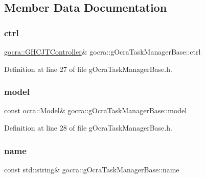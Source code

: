\subsection{Member Data Documentation}
\hypertarget{classgocra_1_1gOcraTaskManagerBase_a52d76d9b54d92f3d31faeaafda99e4c7}{}\label{classgocra_1_1gOcraTaskManagerBase_a52d76d9b54d92f3d31faeaafda99e4c7} 
\subsubsection{\texorpdfstring{ctrl}{ctrl}}
{\footnotesize\ttfamily \hyperlink{classgocra_1_1GHCJTController}{gocra\+::\+G\+H\+C\+J\+T\+Controller}\& gocra\+::g\+Ocra\+Task\+Manager\+Base\+::ctrl\hspace{0.3cm}{\ttfamily [protected]}}



Definition at line 27 of file g\+Ocra\+Task\+Manager\+Base.\+h.

\hypertarget{classgocra_1_1gOcraTaskManagerBase_adc439e7170f7120611fc6d009d06404e}{}\label{classgocra_1_1gOcraTaskManagerBase_adc439e7170f7120611fc6d009d06404e} 
\subsubsection{\texorpdfstring{model}{model}}
{\footnotesize\ttfamily const ocra\+::\+Model\& gocra\+::g\+Ocra\+Task\+Manager\+Base\+::model\hspace{0.3cm}{\ttfamily [protected]}}



Definition at line 28 of file g\+Ocra\+Task\+Manager\+Base.\+h.

\hypertarget{classgocra_1_1gOcraTaskManagerBase_adfda0d31ecfa9afea1380f076a472f37}{}\label{classgocra_1_1gOcraTaskManagerBase_adfda0d31ecfa9afea1380f076a472f37} 
\subsubsection{\texorpdfstring{name}{name}}
{\footnotesize\ttfamily const std\+::string\& gocra\+::g\+Ocra\+Task\+Manager\+Base\+::name\hspace{0.3cm}{\ttfamily [protected]}}



